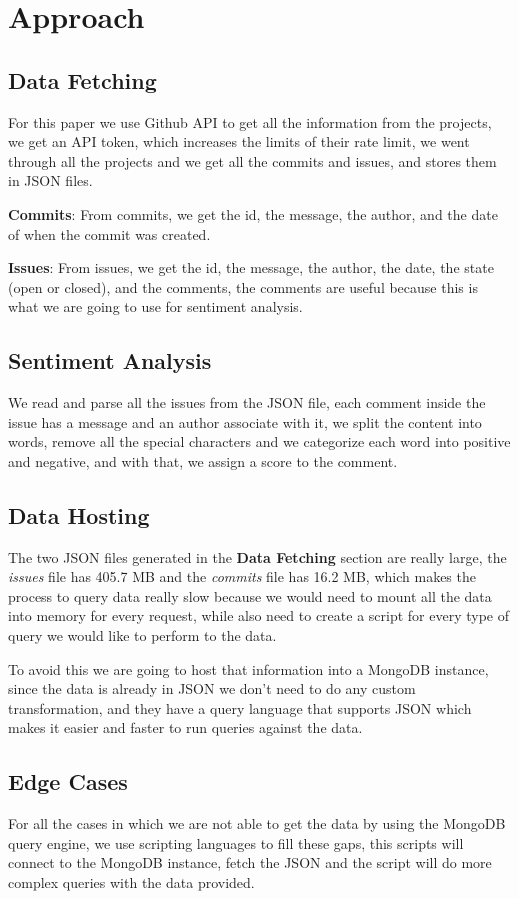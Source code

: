 \section{Approach}
\subsection{Data Fetching}
For this paper we use Github API to get all the information from the projects, we get an API token, which increases the limits of their rate limit, we went through all the projects and we get all the commits and issues, and stores them in JSON files.

\textbf{Commits}: From commits, we get the id, the message, the author, and the date of when the commit was created.

\textbf{Issues}: From issues, we get the id, the message, the author, the date, the state (open or closed), and the comments, the comments are useful because this is what we are going to use for sentiment analysis.

\subsection{Sentiment Analysis}
We read and parse all the issues from the JSON file, each comment inside the issue has a message and an author associate with it, we split the content into words, remove all the special characters and we categorize each word into positive and negative, and with that, we assign a score to the comment.

\subsection{Data Hosting}
The two JSON files generated in the \textbf{Data Fetching} section are really large, the \textit{issues} file has 405.7 MB and the \textit{commits} file has 16.2 MB, which makes the process to query data really slow because we would need to mount all the data into memory for every request, while also need to create a script for every type of query we would like to perform to the data.

To avoid this we are going to host that information into a MongoDB instance, since the data is already in JSON we don't need to do any custom transformation, and they have a query language that supports JSON which makes it easier and faster to run queries against the data.

\subsection{Edge Cases}
For all the cases in which we are not able to get the data by using the MongoDB query engine, we use scripting languages to fill these gaps, this scripts will connect to the MongoDB instance, fetch the JSON and the script will do more complex queries with the data provided.
